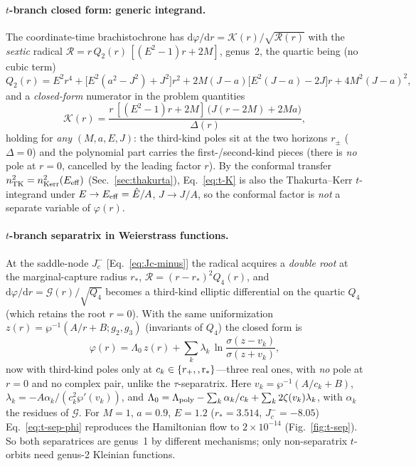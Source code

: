 \documentclass[
    aps, prd, twocolumn, superscriptaddress,
    showpacs, nofootinbib, floatfix
]{revtex4-2}
\newcommand{\Ehat}{\hat E}
\newcommand{\rp}{r_{+}}
\newcommand{\dd}{\mathrm{d}}
\begin{document}
\paragraph{$t$-branch closed form: generic integrand.} The coordinate-time
brachistochrone has $\dd\varphi/\dd r=\mathcal K(r)/\sqrt{\mathcal R(r)}$ with the
\emph{sextic} radical $\mathcal R=r\,Q_2(r)\,[(E^2-1)r+2M]$, genus~2, the quartic
being (no cubic term)
\begin{equation}
    Q_2(r)=E^2r^4+\big[E^2(a^2-J^2)+J^2\big]r^2
      +2M(J-a)\big[E^2(J-a)-2J\big]r+4M^2(J-a)^2,
    \label{eq:t-Q2}
\end{equation}
and a \emph{closed-form} numerator in the problem quantities
\begin{equation}
    \mathcal K(r)=\frac{r\,[(E^2-1)r+2M]\,\big(J(r-2M)+2Ma\big)}{\Delta(r)},
    \label{eq:t-K}
\end{equation}
holding for \emph{any} $(M,a,E,J)$: the third-kind poles sit at the two horizons
$r_\pm$ ($\Delta=0$) and the polynomial part carries the first-/second-kind
pieces (there is \emph{no} pole at $r=0$, cancelled by the leading factor $r$).
By the conformal transfer $n^2_{\rm TK}=n^2_{\rm Kerr}(E_{\rm eff})$
(Sec.~\ref{sec:thakurta}), Eq.~\eqref{eq:t-K} is also the Thakurta--Kerr
$t$-integrand under $E\to E_{\rm eff}=\Ehat/A$, $J\to J/A$, so the conformal
factor is \emph{not} a separate variable of $\varphi(r)$.

\paragraph{$t$-branch separatrix in Weierstrass functions.} At the saddle-node
$J_c^-$ [Eq.~\eqref{eq:Jc-minus}] the radical acquires a
\emph{double root} at the marginal-capture radius $r_*$,
$\mathcal R=(r-r_*)^2 Q_4(r)$, and
$\dd\varphi/\dd r=\mathcal G(r)/\sqrt{Q_4}$ becomes a third-kind elliptic
differential on the quartic $Q_4$ (which retains the root $r=0$). With the same
uniformization $z(r)=\wp^{-1}(A/r+B;g_2,g_3)$ (invariants of $Q_4$) the closed
form is
\begin{equation}
    \varphi(r)=\Lambda_0\,z(r)+\sum_{k}\lambda_k\,
      \ln\frac{\sigma(z-v_k)}{\sigma(z+v_k)},
    \label{eq:t-sep-phi}
\end{equation}
now with third-kind poles only at $c_k\in\{\rp,\rm,r_*\}$---three real ones, with
\emph{no} pole at $r=0$ and no complex pair, unlike the $\tau$-separatrix. Here
$v_k=\wp^{-1}(A/c_k+B)$, $\lambda_k=-A\alpha_k/(c_k^2\wp'(v_k))$, and
$\Lambda_0=\Lambda_{\rm poly}-\sum_k\alpha_k/c_k+\sum_k 2\zeta(v_k)\lambda_k$,
with $\alpha_k$ the residues of $\mathcal G$. For $M=1$, $a=0.9$, $E=1.2$
($r_*=3.514$, $J_c^-=-8.05$) Eq.~\eqref{eq:t-sep-phi} reproduces the Hamiltonian
flow to $2\times10^{-14}$ (Fig.~\ref{fig:t-sep}). So both separatrices are
genus~1 by different mechanisms; only non-separatrix $t$-orbits need genus-2
Kleinian functions.
\end{document}
